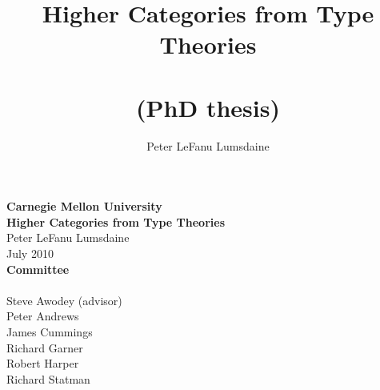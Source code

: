 \documentclass[11pt]{amsbook}
\begin{document}
\frontmatter



\title{Higher Categories from Type Theories \\~\\ \normalsize (PhD thesis)}

\author[P. LeF. Lumsdaine]{Peter LeFanu Lumsdaine}


\maketitle
\newpage
\thispagestyle{empty}
\begin{center}
  {\Large\textbf{Carnegie Mellon University}}\\
  \vspace{1cm}
  {\large\textbf{Higher Categories from Type Theories}}\\
  \vspace{.5cm}
  Peter LeFanu Lumsdaine\\
  \vspace{.5cm}
  July 2010\\
  \vspace{3cm}
  \textbf{Committee}\\~\\
  Steve Awodey (advisor)\\
  Peter Andrews \\
  James Cummings \\
  Richard Garner \\
  Robert Harper \\
  Richard Statman \\

\end{center}
 
\setcounter{page}{3}




\tableofcontents


\end{document}

